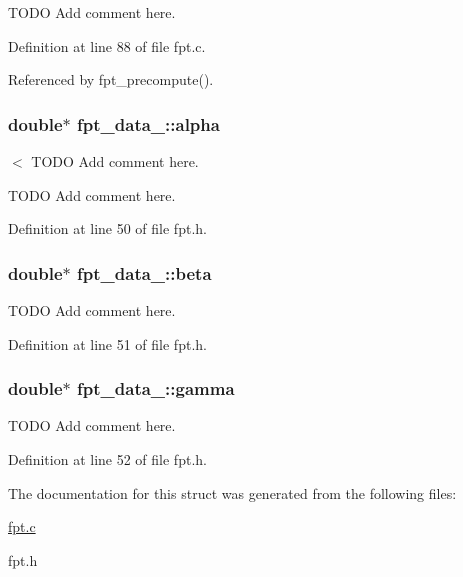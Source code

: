 T\-O\-D\-O Add comment here. 



Definition at line 88 of file fpt.\-c.



Referenced by fpt\-\_\-precompute().

\hypertarget{structfpt__data___ad56b765b9faabb4071e844e7d1355151}{
\subsubsection[{alpha}]{\setlength{\rightskip}{0pt plus 5cm}double$\ast$ fpt\-\_\-data\-\_\-\-::alpha}}\label{structfpt__data___ad56b765b9faabb4071e844e7d1355151}


$<$ T\-O\-D\-O Add comment here. 

T\-O\-D\-O Add comment here. 

Definition at line 50 of file fpt.\-h.

\hypertarget{structfpt__data___af28f490521ca26420df33a1f590363e3}{
\subsubsection[{beta}]{\setlength{\rightskip}{0pt plus 5cm}double$\ast$ fpt\-\_\-data\-\_\-\-::beta}}\label{structfpt__data___af28f490521ca26420df33a1f590363e3}


T\-O\-D\-O Add comment here. 



Definition at line 51 of file fpt.\-h.

\hypertarget{structfpt__data___a13aaa57c27f3ab5eab4c28d47d501723}{
\subsubsection[{gamma}]{\setlength{\rightskip}{0pt plus 5cm}double$\ast$ fpt\-\_\-data\-\_\-\-::gamma}}\label{structfpt__data___a13aaa57c27f3ab5eab4c28d47d501723}


T\-O\-D\-O Add comment here. 



Definition at line 52 of file fpt.\-h.



The documentation for this struct was generated from the following files\-:\begin{DoxyCompactItemize}
\item 
\hyperlink{fpt_8c}{fpt.\-c}\item 
fpt.\-h\end{DoxyCompactItemize}
